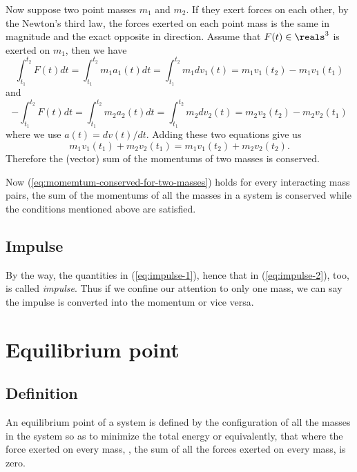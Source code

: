 \documentclass{article}
\begin{document}
Now suppose two point masses $m_1$ and $m_2$.
If they exert forces on each other,
by the Newton's third law,
the forces exerted on each point mass
is the same in magnitude and the exact opposite in direction.
Assume that $F(t)\in\reals^3$ is exerted on $m_1$, then we have
\begin{equation}
\label{eq:impulse-1}
	\int_{t_1}^{t_2} F(t) dt
= \int_{t_1}^{t_2} m_1 a_1(t) dt
= \int_{t_1}^{t_2} m_1 dv_1(t)
= m_1v_1(t_2) - m_1 v_1(t_1)
\end{equation}
and
\begin{equation}
\label{eq:impulse-2}
	-\int_{t_1}^{t_2} F(t) dt
= \int_{t_1}^{t_2} m_2 a_2(t) dt
= \int_{t_1}^{t_2} m_2 dv_2(t)
= m_2v_2(t_2) - m_2 v_2(t_1)
\end{equation}
where we use $a(t) = dv(t) / dt$.
Adding these two equations give us
\begin{equation}
\label{eq:momemtum-conserved-for-two-masses}
m_1v_1(t_1) + m_2v_2(t_1)
=
m_1v_1(t_2) + m_2v_2(t_2).
\end{equation}
Therefore the (vector) sum of the momentums of two masses is conserved.

Now (\ref{eq:momemtum-conserved-for-two-masses}) holds for every interacting mass pairs,
the sum of the momentums of all the masses in a system is conserved
while the conditions mentioned above are satisfied.

\subsection{Impulse}

By the way, the quantities in (\ref{eq:impulse-1}), hence that in (\ref{eq:impulse-2}), too,
is called \emph{impulse}.
Thus if we confine our attention to only one mass,
we can say the impulse is converted into the momentum or vice versa.


\section{Equilibrium point}

\subsection{Definition}

An equilibrium point of a system
is defined by the configuration of all the masses in the system
so as to minimize the total energy
or equivalently,
that where the force exerted on every mass, \ie, the sum of all the forces exerted on every mass,
is zero.
\end{document}

